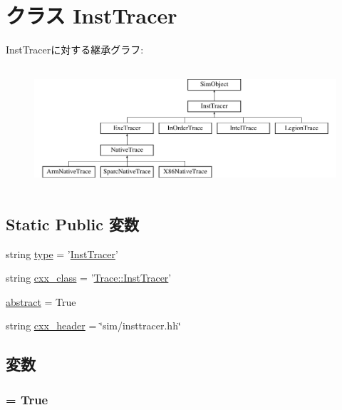 \hypertarget{classInstTracer_1_1InstTracer}{
\section{クラス InstTracer}
\label{classInstTracer_1_1InstTracer}
}
InstTracerに対する継承グラフ:\begin{figure}[H]
\begin{center}
\leavevmode
\includegraphics[height=4.55285cm]{classInstTracer_1_1InstTracer}
\end{center}
\end{figure}
\subsection*{Static Public 変数}
\begin{DoxyCompactItemize}
\item 
string \hyperlink{classInstTracer_1_1InstTracer_acce15679d830831b0bbe8ebc2a60b2ca}{type} = '\hyperlink{classInstTracer_1_1InstTracer}{InstTracer}'
\item 
string \hyperlink{classInstTracer_1_1InstTracer_a58cd55cd4023648e138237cfc0822ae3}{cxx\_\-class} = '\hyperlink{classTrace_1_1InstTracer}{Trace::InstTracer}'
\item 
\hyperlink{classInstTracer_1_1InstTracer_a17fa61ac3806b481cafee5593b55e5d0}{abstract} = True
\item 
string \hyperlink{classInstTracer_1_1InstTracer_a17da7064bc5c518791f0c891eff05fda}{cxx\_\-header} = \char`\"{}sim/insttracer.hh\char`\"{}
\end{DoxyCompactItemize}


\subsection{変数}
\hypertarget{classInstTracer_1_1InstTracer_a17fa61ac3806b481cafee5593b55e5d0}{
\subsubsection[{abstract}]{ = True}}
\label{classInstTracer_1_1InstTracer_a17fa61ac3806b481cafee5593b55e5d0}


